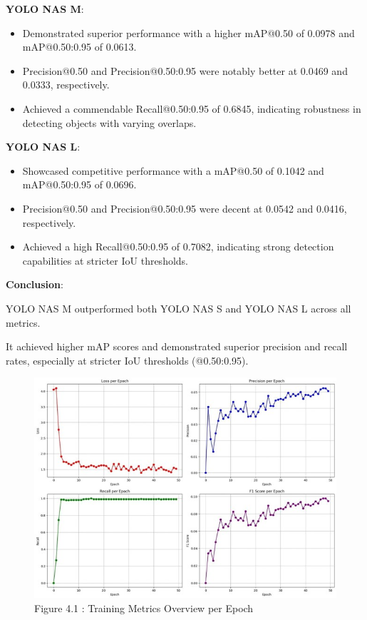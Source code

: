 \textbf{YOLO NAS M}:
\begin{itemize}
    \item Demonstrated superior performance with a higher mAP@0.50 of 0.0978 and mAP@0.50:0.95 of 0.0613.
    \item Precision@0.50 and Precision@0.50:0.95 were notably better at 0.0469 and 0.0333, respectively.
    \item Achieved a commendable Recall@0.50:0.95 of 0.6845, indicating robustness in detecting objects with varying overlaps.
\end{itemize}

\textbf{YOLO NAS L}:
\begin{itemize}
    \item Showcased competitive performance with a mAP@0.50 of 0.1042 and mAP@0.50:0.95 of 0.0696.
    \item Precision@0.50 and Precision@0.50:0.95 were decent at 0.0542 and 0.0416, respectively.
    \item Achieved a high Recall@0.50:0.95 of 0.7082, indicating strong detection capabilities at stricter IoU thresholds.
\end{itemize}

\textbf{Conclusion}:

YOLO NAS M outperformed both YOLO NAS S and YOLO NAS L across all metrics.

It achieved higher mAP scores and demonstrated superior precision and recall rates, especially at stricter IoU thresholds (@0.50:0.95).

\begin{figure}[ht]
    \centering
    \includegraphics[scale=1.0]{figures/Training Metric Overview.jpg}
    \caption{Figure 4.1 : Training Metrics Overview per Epoch}
    \label{fig:example-01}
\end{figure}


